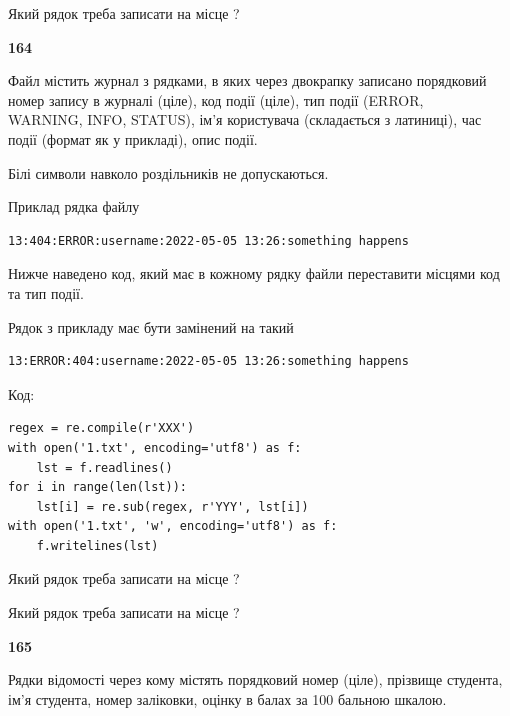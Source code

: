 Який рядок треба записати на місце  ?\par


\newpage

{\begin {center}\textbf{ 164}\end {center}}\par
Файл  містить журнал з рядками, в яких через двокрапку записано поряд\-ко\-вий номер запису в журналі (ціле), код події (ціле), тип події (ERROR,\\ WARNING, INFO, STATUS), ім'я користувача (складається з латиниці), час події (фор\-мат як у прикладі), опис події.

Білі символи навколо роздільників не допускаються.

Приклад рядка файлу



\begin{verbatim}
13:404:ERROR:username:2022-05-05 13:26:something happens
\end{verbatim}


Нижче наведено код, який має в кожному рядку файли переставити місцями код та тип події.

Рядок з прикладу має бути замінений на такий



\begin{verbatim}
13:ERROR:404:username:2022-05-05 13:26:something happens
\end{verbatim}




Код:



\begin{verbatim}
regex = re.compile(r'XXX')
with open('1.txt', encoding='utf8') as f:
    lst = f.readlines()
for i in range(len(lst)):
    lst[i] = re.sub(regex, r'YYY', lst[i])
with open('1.txt', 'w', encoding='utf8') as f:
    f.writelines(lst)
\end{verbatim}







Який рядок треба записати на місце  ?\par
\vspace{5mm}


Який рядок треба записати на місце  ?\par


\newpage

{\begin {center}\textbf{ 165}\end {center}}\par
Рядки відомості через кому містять порядковий номер (ціле), пріз\-ви\-ще студен\-та, ім'я студента, номер заліковки, оцінку в балах за 100 бальною шкалою.

